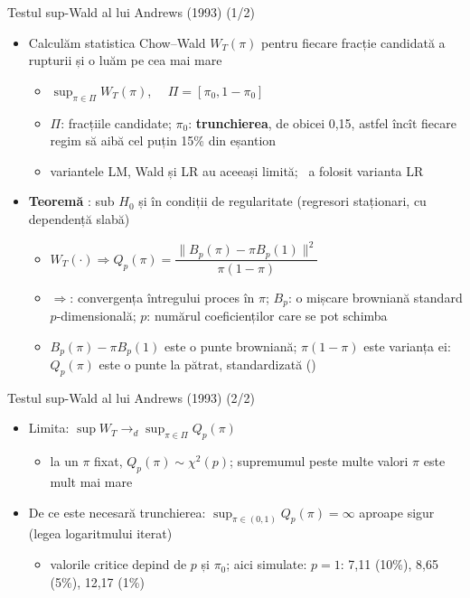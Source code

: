 \begin{frame}{Testul sup-Wald al lui Andrews (1993) (1/2)}
\itemsize{\small}
\begin{itemize}
    \item Calculăm statistica Chow--Wald $W_T(\pi)$ pentru fiecare fracție candidată a rupturii și o luăm pe cea mai mare 
    \begin{itemize}
        \item $\sup_{\pi \in \Pi} W_T(\pi)$, $\quad \Pi = [\pi_0, 1 - \pi_0]$
        \item $\Pi$: fracțiile candidate; $\pi_0$: \textbf{trunchierea}, de obicei 0,15, astfel încît fiecare regim să aibă cel puțin 15\% din eșantion
        \item variantele LM, Wald și LR au aceeași limită; \ a folosit varianta LR
    \end{itemize}
    \item \textbf{Teoremă} : sub $H_0$ și în condiții de regularitate (regresori staționari, cu dependență slabă)
    \begin{itemize}
        \item $W_T(\cdot) \Rightarrow Q_p(\pi) = \dfrac{\|B_p(\pi) - \pi B_p(1)\|^2}{\pi(1 - \pi)}$
        \item $\Rightarrow$: convergența întregului proces în $\pi$; $B_p$: o mișcare browniană standard $p$-dimensională; $p$: numărul coeficienților care se pot schimba
        \item $B_p(\pi) - \pi B_p(1)$ este o punte browniană; $\pi(1 - \pi)$ este varianța ei: $Q_p(\pi)$ este o punte la pătrat, standardizată ()
    \end{itemize}
\end{itemize}
\end{frame}

\begin{frame}{Testul sup-Wald al lui Andrews (1993) (2/2)}
\itemsize{\small}
\begin{itemize}
    \item Limita: $\sup W_T \to_d \sup_{\pi \in \Pi} Q_p(\pi)$
    \begin{itemize}
        \item la un $\pi$ fixat, $Q_p(\pi) \sim \chi^2(p)$; supremumul peste multe valori $\pi$ este mult mai mare
    \end{itemize}
    \item De ce este necesară trunchierea: $\sup_{\pi \in (0,1)} Q_p(\pi) = \infty$ aproape sigur (legea logaritmului iterat)
    \begin{itemize}
        \item valorile critice depind de $p$ și $\pi_0$; aici simulate: $p = 1$: 7{,}11 (10\%), 8{,}65 (5\%), 12{,}17 (1\%)
    \end{itemize}
\end{itemize}
\end{frame}

